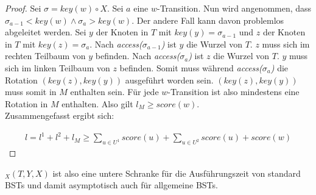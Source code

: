\documentclass[a4paper,12pt]{article}
\begin{document}
\begin{proof}
	Sei $\sigma = \mathit{key}(w) \circ X$. Sei $a$ eine $w$-Transition. Nun wird angenommen, dass $\sigma_{a-1} < \mathit{key}(w)  \land \sigma_{a} > \mathit{key}(w)$. Der andere Fall kann davon problemlos abgeleitet werden. Sei $y$ der Knoten in $T$ mit $\mathit{key}(y) = \sigma_{a-1}$ und $z$ der Knoten in $T$ mit $\mathit{key}(z) = \sigma_{a}$. Nach \textit{access($\sigma_{a-1}$)} ist $y$ die Wurzel von $T$. $z$ muss sich im rechten Teilbaum von $y$ befinden. Nach  \textit{access($\sigma_{a}$)} ist $z$ die Wurzel von $T$. $y$ muss sich im linken Teilbaum von $z$ befinden. Somit muss während \textit{access($\sigma_{a}$)} die Rotation $(\mathit{key}(z),\mathit{key}(y))$ ausgeführt worden sein. $(\mathit{key}(z),\mathit{key}(y))$ muss somit in $M$ enthalten sein. Für jede $w$-Transition ist also mindestens eine Rotation in $M$ enthalten. Also gilt $l_M \geq  \mathit{score} \left(w\right)$.\\
	Zusammengefasst ergibt sich:
	
	\begin{align*}
	l = l^1 + l^2 + l_M \geq \sum_{u \in U^1} {\mathit{score}} (u) + \sum_{u \in U^2}{\mathit{score}} (u) +  {\mathit{score}} (w)
	\end{align*}
	
	
	
	
\end{proof}

\noindent   $_X(T, Y, X)$ ist also eine untere Schranke für die Ausführungszeit von standard BSTs und damit asymptotisch auch für allgemeine BSTs.  
\end{document}
